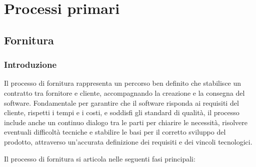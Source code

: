 \section{Processi primari}


\subsection{Fornitura}
\subsubsection{Introduzione}
Il processo di fornitura rappresenta un percorso ben definito che stabilisce un contratto tra fornitore e cliente, 
accompagnando la creazione e la consegna del software. 
Fondamentale per garantire che il software risponda ai requisiti del cliente, rispetti i tempi e i costi, 
e soddisfi gli standard di qualità, il processo include anche un continuo dialogo tra le parti per chiarire le necessità, 
risolvere eventuali difficoltà tecniche e stabilire le basi per il corretto sviluppo del prodotto, 
attraverso un'accurata definizione dei requisiti e dei vincoli tecnologici.

Il processo di fornitura si articola nelle seguenti fasi principali:

